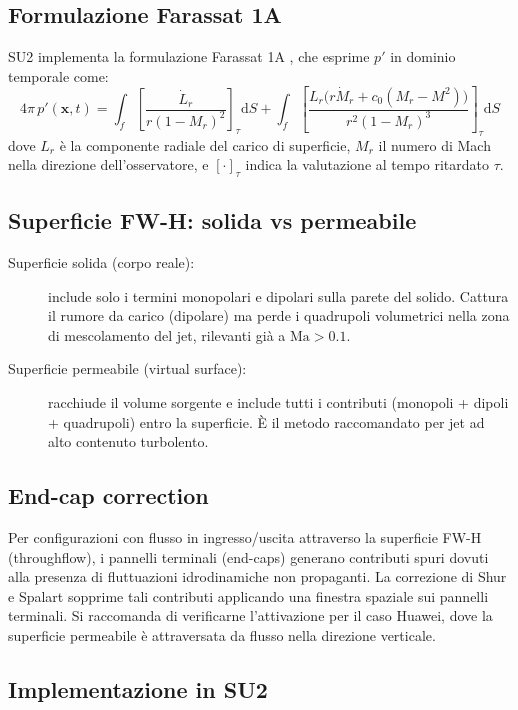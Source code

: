 \documentclass[11pt,a4paper]{article}
\newcommand{\Ma}{\mathrm{Ma}}
\begin{document}
\subsection{Formulazione Farassat 1A}

SU2 implementa la formulazione Farassat 1A \cite{farassat2007}, che esprime
$p'$ in dominio temporale come:
\[
  4\pi\,p'(\mathbf{x},t) = \int_f \left[\frac{\dot{L}_r}{r(1-M_r)^2}\right]_\tau \mathrm{d}S
  + \int_f \left[\frac{L_r\bigl(r\dot{M}_r + c_0(M_r - M^2)\bigr)}{r^2(1-M_r)^3}\right]_\tau \mathrm{d}S
\]
dove $L_r$ è la componente radiale del carico di superficie, $M_r$ il numero
di Mach nella direzione dell'osservatore, e $[\cdot]_\tau$ indica la valutazione
al tempo ritardato $\tau$.

\subsection{Superficie FW-H: solida vs permeabile}

\begin{description}
  \item[Superficie solida (corpo reale):] include solo i termini monopolari
        e dipolari sulla parete del solido. Cattura il rumore da carico
        (dipolare) ma perde i quadrupoli volumetrici nella zona di mescolamento
        del jet, rilevanti già a $\Ma > 0.1$.
  \item[Superficie permeabile (virtual surface):] racchiude il volume sorgente
        e include tutti i contributi (monopoli + dipoli + quadrupoli) entro
        la superficie. È il metodo raccomandato per jet ad alto contenuto
        turbolento.
\end{description}

\subsection{End-cap correction}

Per configurazioni con flusso in ingresso/uscita attraverso la superficie
FW-H (throughflow), i pannelli terminali (end-caps) generano contributi
spuri dovuti alla presenza di fluttuazioni idrodinamiche non propaganti.
La correzione di Shur e Spalart \cite{shur2005} sopprime tali contributi
applicando una finestra spaziale sui pannelli terminali.
Si raccomanda di verificarne l'attivazione per il caso Huawei, dove la
superficie permeabile è attraversata da flusso nella direzione verticale.

\subsection{Implementazione in SU2}
\end{document}
